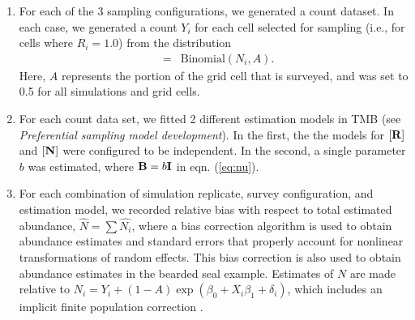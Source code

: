\documentclass[times,mee,doublespace,]{besauth2}
\begin{document}
\begin{flushleft}
\begin{enumerate}
  \item For each of the 3 sampling configurations, we generated a count dataset.  In each case, we generated a count $Y_i$ for each cell selected for sampling (i.e., for cells where $R_i=1.0$) from the distribution
      \begin{eqnarray*}
        [Y_i|N_i] & = & \textrm{Binomial}(N_i,A).
      \end{eqnarray*}
      Here, $A$ represents the portion of the grid cell that is surveyed, and was set to 0.5 for all simulations and grid cells.
  \item For each count data set, we fitted 2 different estimation models in TMB (see \textit{Preferential sampling model development}).  In the first, the the models for $[{\bf R}]$ and $[{\bf N}]$ were configured to be independent.  In the second, a single parameter $b$ was estimated, where ${\bf B} = b {\bf I}$ in eqn. (\ref{eq:nu}).
  \item For each combination of simulation replicate, survey configuration, and estimation model, we recorded relative bias with respect to total estimated abundance, $\hat{N} = \sum \hat{N_i}$, where a bias correction algorithm \citep{TierneyEtAl1989,ThorsonKristensen2016} is used to obtain abundance estimates and standard errors that properly account for nonlinear transformations of random effects.  This bias correction is also used to obtain abundance estimates in the bearded seal example.  Estimates of $N$ are made relative to $N_i = Y_i + (1-A) \exp(\beta_0 + X_i \beta_1 + \delta_i)$, which includes an implicit finite population correction \citep{JohnsonEtAl2010}.
\end{enumerate}





\pagebreak


\end{flushleft}
\end{document}
